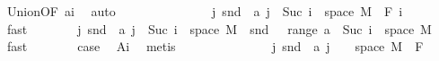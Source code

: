 \begin{isabellebody}
\ Union{\isacharparenleft}{\kern0pt}{}{\isacharcomma}{\kern0pt}{}{\isacharparenright}{\kern0pt}{\isacharbrackleft}{\kern0pt}OF\ a{\isacharunderscore}{\kern0pt}i{\isacharbrackright}{\kern0pt}\ \isamarkupfalse%
\ auto\isanewline
\ \ \isacommand{{\isacharbraceleft}{\kern0pt}}\isamarkupfalse%
\isanewline
\ \ \ \ \isamarkupfalse%
\ {}\isanewline
\ \ \ \ \isamarkupfalse%
\ {\isachardoublequoteopen}{\isacharparenleft}{\kern0pt}{\isasymUnion}j{\isachardot}{\kern0pt}\ snd\ {\isacharbackquote}{\kern0pt}\ {\isacharparenleft}{\kern0pt}a\ j\ {\isasyminter}\ {\isacharparenleft}{\kern0pt}{\isacharbraceleft}{\kern0pt}Suc\ i{\isacharbraceright}{\kern0pt}\ {\isasymtimes}\ space\ M{\isacharparenright}{\kern0pt}{\isacharparenright}{\kern0pt}{\isacharparenright}{\kern0pt}\ {\isasymin}\ F\ i{\isachardoublequoteclose}\ \isamarkupfalse%
\ {\isacharasterisk}{\kern0pt}\ \isamarkupfalse%
\ fast\isanewline
\ \ \ \ \isamarkupfalse%
\ \isamarkupfalse%
\ {\isachardoublequoteopen}{\isacharparenleft}{\kern0pt}{\isasymUnion}j{\isachardot}{\kern0pt}\ snd\ {\isacharbackquote}{\kern0pt}\ {\isacharparenleft}{\kern0pt}a\ j\ {\isasyminter}\ {\isacharparenleft}{\kern0pt}{\isacharbraceleft}{\kern0pt}Suc\ i{\isacharbraceright}{\kern0pt}\ {\isasymtimes}\ space\ M{\isacharparenright}{\kern0pt}{\isacharparenright}{\kern0pt}{\isacharparenright}{\kern0pt}\ {\isacharequal}{\kern0pt}\ snd\ {\isacharbackquote}{\kern0pt}\ {\isacharparenleft}{\kern0pt}{\isasymUnion}\ {\isacharparenleft}{\kern0pt}range\ a{\isacharparenright}{\kern0pt}\ {\isasyminter}\ {\isacharparenleft}{\kern0pt}{\isacharbraceleft}{\kern0pt}Suc\ i{\isacharbraceright}{\kern0pt}\ {\isasymtimes}\ space\ M{\isacharparenright}{\kern0pt}{\isacharparenright}{\kern0pt}{\isachardoublequoteclose}\ \isamarkupfalse%
\ fast\isanewline
\ \ \ \ \isamarkupfalse%
\ \isamarkupfalse%
\ {\isacharquery}{\kern0pt}case\ \isamarkupfalse%
\ A{\isacharunderscore}{\kern0pt}i\ \isamarkupfalse%
\ metis\isanewline
\ \ \isamarkupfalse%
\isanewline
\ \ \ \ \isamarkupfalse%
\ {}\isanewline
\ \ \ \ \isamarkupfalse%
\ {\isachardoublequoteopen}{\isacharparenleft}{\kern0pt}{\isasymUnion}j{\isachardot}{\kern0pt}\ snd\ {\isacharbackquote}{\kern0pt}\ {\isacharparenleft}{\kern0pt}a\ j\ {\isasyminter}\ {\isacharparenleft}{\kern0pt}{\isacharbraceleft}{\kern0pt}{}{\isacharbraceright}{\kern0pt}\ {\isasymtimes}\ space\ M{\isacharparenright}{\kern0pt}{\isacharparenright}{\kern0pt}{\isacharparenright}{\kern0pt}\ {\isasymin}\ F\ {}{\isachardoublequoteclose}\ \isamarkupfalse%

\end{isabellebody}
